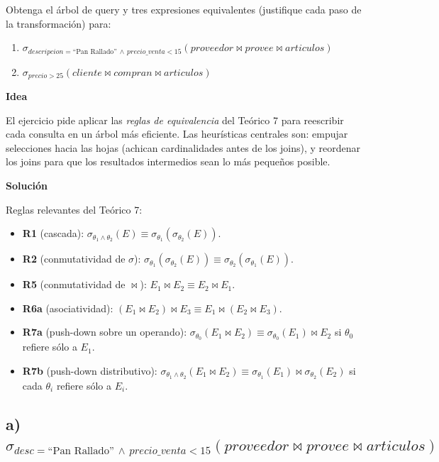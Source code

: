 \documentclass[11pt,a4paper]{article}
\newcommand{\sel}[1]{\sigma_{#1}}
\newcommand{\jn}{\bowtie}
\newcommand{\itemcabecera}[1]{\noindent\textbf{#1}\par\medskip}
\newcommand{\bloqueIdea}{\itemcabecera{Idea}}
\newcommand{\bloqueSolucion}{\itemcabecera{Soluci\'on}}
\begin{document}
Obtenga el árbol de query y tres expresiones equivalentes (justifique cada paso de la transformación) para:

\begin{enumerate}[label=\alph*),leftmargin=*]
    \item $\sel{descripcion = \text{``Pan Rallado''} \,\wedge\, precio\_venta < 15}(proveedor \jn provee \jn articulos)$
    \item $\sel{precio>25}(cliente \jn compran \jn articulos)$
\end{enumerate}

\bloqueIdea

El ejercicio pide aplicar las \emph{reglas de equivalencia} del Teórico 7 para reescribir cada consulta en un árbol más eficiente. Las heurísticas centrales son: empujar selecciones hacia las hojas (achican cardinalidades antes de los joins), y reordenar los joins para que los resultados intermedios sean lo más pequeños posible.

\bloqueSolucion

Reglas relevantes del Teórico 7:

\begin{itemize}
    \item \textbf{R1} (cascada): $\sel{\theta_1 \wedge \theta_2}(E) \equiv \sel{\theta_1}(\sel{\theta_2}(E))$.
    \item \textbf{R2} (conmutatividad de $\sigma$): $\sel{\theta_1}(\sel{\theta_2}(E)) \equiv \sel{\theta_2}(\sel{\theta_1}(E))$.
    \item \textbf{R5} (conmutatividad de $\jn$): $E_1 \jn E_2 \equiv E_2 \jn E_1$.
    \item \textbf{R6a} (asociatividad): $(E_1 \jn E_2)\jn E_3 \equiv E_1 \jn (E_2 \jn E_3)$.
    \item \textbf{R7a} (push-down sobre un operando): $\sel{\theta_0}(E_1\jn E_2) \equiv \sel{\theta_0}(E_1)\jn E_2$ si $\theta_0$ refiere sólo a $E_1$.
    \item \textbf{R7b} (push-down distributivo): $\sel{\theta_1\wedge\theta_2}(E_1\jn E_2)\equiv \sel{\theta_1}(E_1)\jn \sel{\theta_2}(E_2)$ si cada $\theta_i$ refiere sólo a $E_i$.
\end{itemize}

\subsection{a) $\sel{desc = \text{``Pan Rallado''} \,\wedge\, precio\_venta < 15}(proveedor \jn provee \jn articulos)$}
\end{document}
